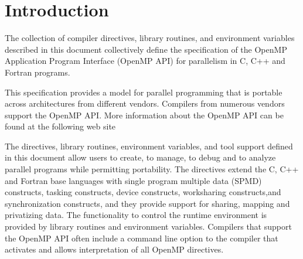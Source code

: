 \chapter{Introduction}
\label{chap:introduction}
The collection of compiler directives, library routines, and environment
variables described in this document collectively define the specification of
the OpenMP Application Program Interface (OpenMP API) for parallelism in C, C++
and Fortran programs.

This specification provides a model for parallel programming that is portable
across architectures from different vendors. Compilers from numerous vendors
support the OpenMP API. More information about the OpenMP API can be found at
the following web site


The directives, library routines, environment variables, and tool support 
defined in this document allow users to create, to manage, to debug and to 
analyze parallel programs while permitting portability. The directives extend 
the C, C++ and Fortran base languages with single program multiple
data (SPMD) constructs, tasking constructs, device constructs, worksharing 
constructs,and synchronization constructs, and they provide support for 
sharing, mapping and privatizing data. The functionality to control the 
runtime environment is provided by library routines and environment 
variables. Compilers that support the OpenMP API often include a command 
line option to the compiler that activates and allows interpretation of
all OpenMP directives.












